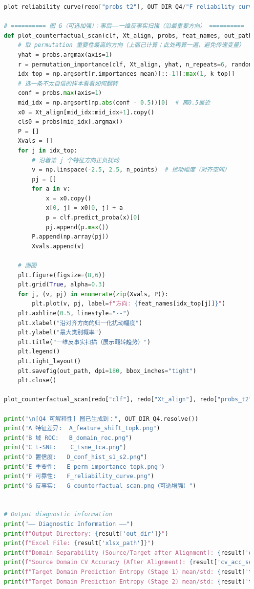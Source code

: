 \documentclass[a4paper]{CPIPC}
\numberwithin{equation}{section}
\begin{document}
\begin{lstlisting}[language=Python, caption=Random Forest Classifier]
plot_reliability_curve(redo["probs_t2"], OUT_DIR_Q4/"F_reliability_curve.png", n_bins=12)

# ========== 图 G（可选加强）：事后——一维反事实扫描（沿最重要方向） ==========
def plot_counterfactual_scan(clf, Xt_align, probs, feat_names, out_path, k_top=1, n_points=40):
    # 取 permutation 重要性最高的方向（上面已计算；此处再算一遍，避免传递变量）
    yhat = probs.argmax(axis=1)
    r = permutation_importance(clf, Xt_align, yhat, n_repeats=6, random_state=42, n_jobs=-1)
    idx_top = np.argsort(r.importances_mean)[::-1][:max(1, k_top)]
    # 选一条不太自信的样本看看如何翻转
    conf = probs.max(axis=1)
    mid_idx = np.argsort(np.abs(conf - 0.5))[0]  # 离0.5最近
    x0 = Xt_align[mid_idx:mid_idx+1].copy()
    cls0 = probs[mid_idx].argmax()
    P = []
    Xvals = []
    for j in idx_top:
        # 沿着第 j 个特征方向正负扰动
        v = np.linspace(-2.5, 2.5, n_points)  # 扰动幅度（对齐空间）
        pj = []
        for a in v:
            x = x0.copy()
            x[0, j] = x0[0, j] + a
            p = clf.predict_proba(x)[0]
            pj.append(p.max())
        P.append(np.array(pj))
        Xvals.append(v)

    # 画图
    plt.figure(figsize=(8,6))
    plt.grid(True, alpha=0.3)
    for j, (v, pj) in enumerate(zip(Xvals, P)):
        plt.plot(v, pj, label=f"方向: {feat_names[idx_top[j]]}")
    plt.axhline(0.5, linestyle="--")
    plt.xlabel("沿对齐方向的归一化扰动幅度")
    plt.ylabel("最大类别概率")
    plt.title("一维反事实扫描（展示翻转趋势）")
    plt.legend()
    plt.tight_layout()
    plt.savefig(out_path, dpi=180, bbox_inches="tight")
    plt.close()

plot_counterfactual_scan(redo["clf"], redo["Xt_align"], redo["probs_t2"], col, OUT_DIR_Q4/"G_counterfactual_scan.png")

print("\n[Q4 可解释性] 图已生成到：", OUT_DIR_Q4.resolve())
print("A 特征差异:  A_feature_shift_topk.png")
print("B 域 ROC:   B_domain_roc.png")
print("C t-SNE:    C_tsne_tca.png")
print("D 置信度:   D_conf_hist_s1_s2.png")
print("E 重要性:   E_perm_importance_topk.png")
print("F 可靠性:   F_reliability_curve.png")
print("G 反事实:   G_counterfactual_scan.png（可选增强）")


# Output diagnostic information
print("—— Diagnostic Information ——")
print(f"Output Directory: {result['out_dir']}")
print(f"Excel File: {result['xlsx_path']}")
print(f"Domain Separability (Source/Target after Alignment): {result['domain_acc_after_coral']:.3f}")
print(f"Source Domain CV Accuracy (After Alignment): {result['cv_acc_source_after_coral']:.3f}")
print(f"Target Domain Prediction Entropy (Stage 1) mean/std: {result['target_entropy_stage1']}")
print(f"Target Domain Prediction Entropy (Stage 2) mean/std: {result['target_entropy_stage2']}")
\end{lstlisting}
\end{document}
